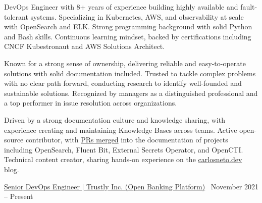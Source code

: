\documentclass[10pt,a4paper]{altacv}
\begin{document}


\makecvheader

\small

\bigskip
\bigskip


DevOps Engineer with 8+ years of experience building highly available and fault-tolerant systems. Specializing in Kubernetes, AWS, and observability at scale with OpenSearch and ELK. Strong programming background with solid Python and Bash skills. Continuous learning mindset, backed by certifications including CNCF Kubestronaut and AWS Solutions Architect.

\medskip

Known for a strong sense of ownership, delivering reliable and easy-to-operate solutions with solid documentation included. Trusted to tackle complex problems with no clear path forward, conducting research to identify well-founded and sustainable solutions. Recognized by managers as a distinguished professional and a top performer in issue resolution across organizations.

\medskip

Driven by a strong documentation culture and knowledge sharing, with experience creating and maintaining Knowledge Bases across teams. Active open-source contributor, with \href{https://carlosneto.dev/whoami/#opensource-contributions}{PRs merged} into the documentation of projects including OpenSearch, Fluent Bit, External Secrets Operator, and OpenCTI. Technical content creator, sharing hands-on experience on the \href{https://www.carlosneto.dev/}{carlosneto.dev} blog.


\bigskip
\bigskip


\medskip

{\large \href{https://us.trustly.com/}{Senior DevOps Engineer | Trustly Inc. (Open Banking Platform)}} \hfill \faCalendar \ November 2021 -- Present
\end{document}
